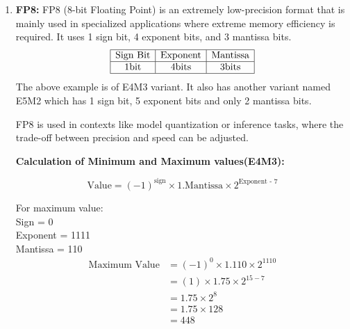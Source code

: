 \begin{enumerate}[label=\textbf{\roman*.}]
\item \textbf{FP8:}
    FP8 (8-bit Floating Point) is an extremely low-precision format that is mainly used in specialized applications where extreme memory efficiency is required. It uses 1 sign bit, 4 exponent bits, and 3 mantissa bits.
    \[
    \begin{array}{|c|c|c|}
        \hline
        \text{Sign Bit} & \text{Exponent} & \text{Mantissa} \\
        \hline
        1 \text{bit} & 4 \text{bits} & 3 \text{bits} \\
        \hline
    \end{array}
    \]
    The above example is of E4M3 variant. It also has another variant named E5M2 which has 1 sign bit, 5 exponent bits and only 2 mantissa bits.
    
    FP8 is used in contexts like model quantization or inference tasks, where the trade-off between precision and speed can be adjusted.

    \textbf{Calculation of Minimum and Maximum values(E4M3):}
    
    \[
    \text{Value} = (-1)^{\text{sign}} \times 1.\text{Mantissa} \times 2^{\text{Exponent - 7}}
    \]

    For maximum value:\\
    Sign = 0 \\
    Exponent = 1111 \\
    Mantissa = 110
    \[
    \begin{aligned}
        \text{Maximum Value} &= (-1)^{0} \times 1.110 \times 2^{1110} \\
        &= (1) \times 1.75 \times 2^{15 - 7} \\
        &= 1.75 \times 2^{8} \\
        &= 1.75 \times 128 \\
        &= 448
    \end{aligned}
    \]
    

\end{enumerate}
